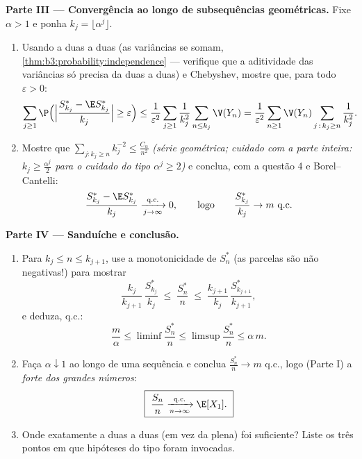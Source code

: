 \begin{problem}
\medskip
\noindent\textbf{Parte III --- Convergência ao longo de subsequências
geométricas.} Fixe $\alpha > 1$ e ponha $k_j =
\lfloor\alpha^j\rfloor$.
\begin{enumerate}[resume]
  \item Usando a  duas a duas (as variâncias se somam,
        \cref{thm:b3:probability:independence} --- verifique que a aditividade das variâncias só
        precisa da  duas a duas) e Chebyshev, mostre que,
        para todo $\varepsilon > 0$:
        \[
        \sum_{j\geq1}\P\Bigl(\Bigl|
        \frac{S^*_{k_j} - \E S^*_{k_j}}{k_j}\Bigr| \geq
        \varepsilon\Bigr)
        \leq
        \frac1{\varepsilon^2}\sum_{j\geq1}\frac1{k_j^2}
        \sum_{n\leq k_j}\V(Y_n)
        = \frac1{\varepsilon^2}\sum_{n\geq1}\V(Y_n)
        \sum_{j\,:\,k_j\geq n}\frac1{k_j^2} .
        \]
  \item Mostre que $\sum_{j : k_j \geq n}k_j^{-2} \leq
        \frac{C_\alpha}{n^2}$ \emph{(série geométrica; cuidado com a parte
        inteira: $k_j \geq \frac{\alpha^j}2$ para o cuidado do tipo $\alpha^j \geq 2$)} e conclua, com a
        questão 4 e Borel--Cantelli:
        \[
        \frac{S^*_{k_j} - \E S^*_{k_j}}{k_j}
        \xrightarrow[j\to\infty]{\text{q.c.}} 0,
        \qquad\text{logo}\qquad
        \frac{S^*_{k_j}}{k_j} \to m \ \text{q.c.}
        \]
\end{enumerate}

\medskip
\noindent\textbf{Parte IV --- Sanduíche e conclusão.}
\begin{enumerate}[resume]
  \item Para $k_j \leq n \leq k_{j+1}$, use a monotonicidade de $S^*_n$ (as parcelas são
        não negativas!) para mostrar
        \[
        \frac{k_j}{k_{j+1}}\,\frac{S^*_{k_j}}{k_j}
        \;\leq\; \frac{S^*_n}{n} \;\leq\;
        \frac{k_{j+1}}{k_j}\,\frac{S^*_{k_{j+1}}}{k_{j+1}},
        \]
        e deduza, q.c.:
        \[
        \frac m\alpha \leq \liminf\frac{S^*_n}n \leq
        \limsup\frac{S^*_n}n \leq \alpha\,m .
        \]
  \item Faça $\alpha \downarrow 1$ ao longo de uma sequência e conclua $\frac{S_n^*}n \to m$ q.c., logo
        (Parte I) a \emph{ forte dos grandes números}:
        \[
        \boxed{\ \frac{S_n}{n}
        \xrightarrow[n\to\infty]{\text{q.c.}} \E[X_1].\ }
        \]
  \item Onde exatamente a  duas a duas (em vez da
         plena) foi suficiente? Liste os três pontos em que
        hipóteses do tipo  foram invocadas.
\end{enumerate}


\end{problem}
